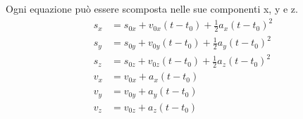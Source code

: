 \documentclass{article}
\begin{document}
Ogni equazione può essere scomposta nelle sue componenti x, y e z.
\begin{align}
  s_x &= s_{0x} + v_{0x} (t-t_0) + \frac{1}{2} a_x (t-t_0)^2 \\
  s_y &= s_{0y} + v_{0y} (t-t_0) + \frac{1}{2} a_y (t-t_0)^2 \\
  s_z &= s_{0z} + v_{0z} (t-t_0) + \frac{1}{2} a_z (t-t_0)^2 \\
  v_x &= v_{0x} + a_x (t-t_0) \\
  v_y &= v_{0y} + a_y (t-t_0) \\
  v_z &= v_{0z} + a_z (t-t_0)
\end{align}
\end{document}

